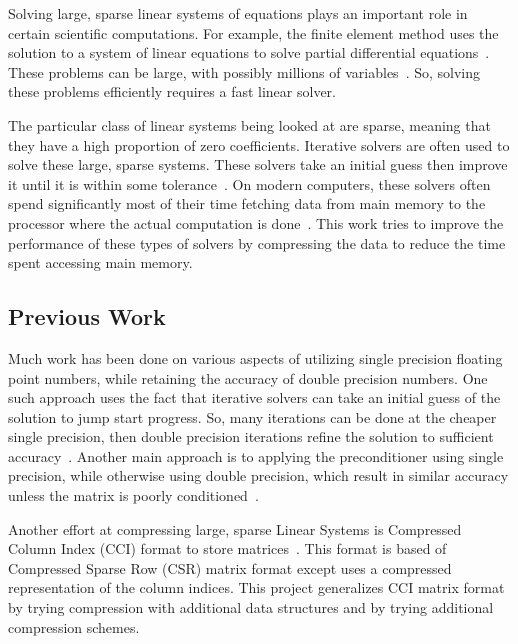 Solving large, sparse linear systems of equations plays an important role in certain scientific computations.
For example, the finite element method uses the solution to a system of linear equations to solve partial differential equations~\cite{Saad:2003:IterativeMethods}.
These problems can be large, with possibly millions of variables~\cite{Davis:2011:FloridaMatrixCollection}.
So, solving these problems efficiently requires a fast linear solver.

The particular class of linear systems being looked at are sparse, meaning that they have a high proportion of zero coefficients.
Iterative solvers are often used to solve these large, sparse systems.
These solvers take an initial guess then improve it until it is within some tolerance~\cite{Saad:2003:IterativeMethods}.
On modern computers, these solvers often spend significantly most of their time fetching data from main memory to the processor where the actual computation is done~\cite{Lawlor:2013:compression}.
This work tries to improve the performance of these types of solvers by compressing the data to reduce the time spent accessing main memory.

\subsection{Previous Work}
Much work has been done on various aspects of utilizing single precision floating point numbers, while retaining the accuracy of double precision numbers.
One such approach uses the fact that iterative solvers can take an initial guess of the solution to jump start progress.
So, many iterations can be done at the cheaper single precision, then double precision iterations refine the solution to sufficient accuracy~\cite{Babolin:2008:coursePass, Buttari:2007:coursePass}.
Another main approach is to applying the preconditioner using single precision, while otherwise using double precision, which result in similar accuracy unless the matrix is poorly conditioned~\cite{Buttari:2008:mixedPrec, Hogg:2010:multiplePasses}.

Another effort at compressing large, sparse Linear Systems is Compressed Column Index (CCI) format to store matrices~\cite{Lawlor:2013:compression}.
This format is based of Compressed Sparse Row (CSR) matrix format except uses a compressed representation of the column indices.
This project generalizes CCI matrix format by trying compression with additional data structures and by trying additional compression schemes.
